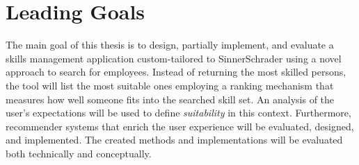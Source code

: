\section{Leading Goals}
The main goal of this thesis is to design, partially implement, and evaluate a skills management application custom-tailored to SinnerSchrader using a novel approach to search for employees. Instead of returning the most skilled persons, the tool will list the most suitable ones employing a ranking mechanism that measures how well someone fits into the searched skill set. An analysis of the user's expectations will be used to define \textit{suitability} in this context.
Furthermore, recommender systems that enrich the user experience will be evaluated, designed, and implemented.
The created methods and implementations will be evaluated both technically and conceptually.
